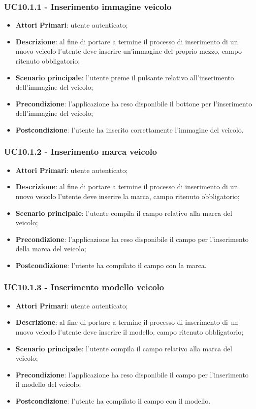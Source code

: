 \subsubsection{UC10.1.1 - Inserimento immagine veicolo}
\begin{itemize}
	\item \textbf{Attori Primari}: utente autenticato;
	\item \textbf{Descrizione}: al fine di portare a termine il processo di inserimento di un nuovo veicolo l'utente deve inserire un'immagine del proprio mezzo, campo ritenuto obbligatorio; 
	\item \textbf{Scenario principale}: l'utente preme il pulsante relativo all'inserimento dell'immagine del veicolo;	
	\item \textbf{Precondizione}: l'applicazione ha reso disponibile il bottone per l'inserimento dell'immagine del veicolo;
	\item \textbf{Postcondizione}: l'utente ha inserito correttamente l'immagine del veicolo.
\end{itemize}
\subsubsection{UC10.1.2 - Inserimento marca veicolo}
\begin{itemize}
	\item \textbf{Attori Primari}: utente autenticato;
	\item \textbf{Descrizione}: al fine di portare a termine il processo di inserimento di un nuovo veicolo l'utente deve inserire la marca, campo ritenuto obbligatorio;
	\item \textbf{Scenario principale}: l'utente compila il campo relativo alla marca del veicolo;	
	\item \textbf{Precondizione}: l'applicazione ha reso disponibile il campo per l'inserimento della marca del veicolo;
	\item \textbf{Postcondizione}: l'utente ha compilato il campo con la marca.	
\end{itemize}
\subsubsection{UC10.1.3 - Inserimento modello veicolo}
\begin{itemize}
	\item \textbf{Attori Primari}: utente autenticato;
	\item \textbf{Descrizione}: al fine di portare a termine il processo di inserimento di un nuovo veicolo l'utente deve inserire il modello, campo ritenuto obbligatorio;
	\item \textbf{Scenario principale}: l'utente compila il campo relativo alla marca del veicolo;	
	\item \textbf{Precondizione}: l'applicazione ha reso disponibile il campo per l'inserimento il modello del veicolo;
	\item \textbf{Postcondizione}: l'utente ha compilato il campo con il modello.	
\end{itemize}
